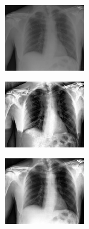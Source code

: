 \documentclass[spanish,twocolumn]{article}
\begin{document}
{\begin{minipage}[b]{1.0\linewidth}
   \begin{minipage}[t]{0.3\linewidth}  
   		\centering
        \includegraphics[width=3.5cm]{Figures/entropia_normal_ssim/imagen3.png}
  	\end{minipage}
  \hspace{1pt}
   \begin{minipage}[t]{0.3\linewidth}  
   		\centering
        \includegraphics[width=3.5cm]{Figures/entropia_normal_ssim/imagen3_210_2_0-078487.png}
  	\end{minipage}
  \hspace{1pt}
   \begin{minipage}[t]{0.3\linewidth}  
   		\centering
        \includegraphics[width=3.5cm]{Figures/entropia_normal_ssim/imagen3_2_2_0-85964.png}
  	\end{minipage}
  \vspace{0.5cm}
    \label{fig:resultado1}

\end{minipage}

\noindent\begin{minipage}[b]{1.0\linewidth}
  \centering
   

\end{minipage}}
\end{document}
